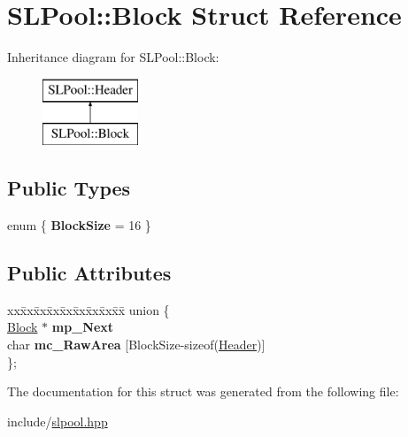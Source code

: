 \hypertarget{struct_s_l_pool_1_1_block}{}\section{S\+L\+Pool\+:\+:Block Struct Reference}
\label{struct_s_l_pool_1_1_block}
Inheritance diagram for S\+L\+Pool\+:\+:Block\+:\begin{figure}[H]
\begin{center}
\leavevmode
\includegraphics[height=2.000000cm]{struct_s_l_pool_1_1_block}
\end{center}
\end{figure}
\subsection*{Public Types}
\begin{DoxyCompactItemize}
\item 
enum \{ {\bfseries Block\+Size} = 16
 \}\hypertarget{struct_s_l_pool_1_1_block_adbb416e65dd0d7aa2121e30b34424db8}{}\label{struct_s_l_pool_1_1_block_adbb416e65dd0d7aa2121e30b34424db8}

\end{DoxyCompactItemize}
\subsection*{Public Attributes}
\begin{DoxyCompactItemize}
\item 
\begin{tabbing}
xx\=xx\=xx\=xx\=xx\=xx\=xx\=xx\=xx\=\kill
union \{\\
\>\hyperlink{struct_s_l_pool_1_1_block}{Block} $\ast$ {\bfseries mp\_Next}\\
\>char {\bfseries mc\_RawArea} \mbox{[}BlockSize-\/sizeof(\hyperlink{struct_s_l_pool_1_1_header}{Header})\mbox{]}\\
\}; \hypertarget{struct_s_l_pool_1_1_block_a77176c27d7b62721129f2d2539ec72b5}{}\label{struct_s_l_pool_1_1_block_a77176c27d7b62721129f2d2539ec72b5}
\\

\end{tabbing}\end{DoxyCompactItemize}


The documentation for this struct was generated from the following file\+:\begin{DoxyCompactItemize}
\item 
include/\hyperlink{slpool_8hpp}{slpool.\+hpp}\end{DoxyCompactItemize}
